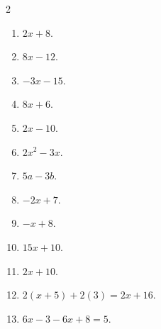 \documentclass[11pt]{article}
\begin{document}
\begin{keybox}
\begin{multicols}{2}
\small
\begin{enumerate}[leftmargin=*,itemsep=3pt]
  \item $2x+8$.
  \item $8x-12$.
  \item $-3x-15$.
  \item $8x+6$.
  \item $2x-10$.
  \item $2x^2-3x$.
  \item $5a-3b$.
  \item $-2x+7$.
  \item $-x+8$.
  \item $15x+10$.
  \item $2x+10$.
  \item $2(x+5)+2(3)=2x+16$.
  \item $6x-3-6x+8=5$.
\end{enumerate}
\end{multicols}
\end{keybox}
\end{document}
